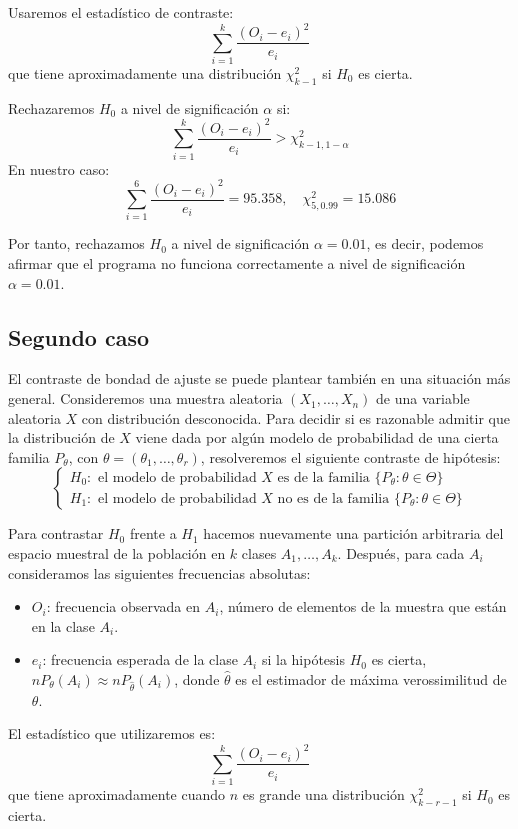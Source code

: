 \begin{example}
    Usaremos el estadístico de contraste:
    $$\sum_{i=1}^k \frac{(O_i-e_i)^2}{e_i}$$
    que tiene aproximadamente una distribución $\chi^2_{k-1}$ si $H_0$ es cierta.

    Rechazaremos $H_0$ a nivel de significación $\alpha$ si:
    $$\sum_{i=1}^k \frac{(O_i-e_i)^2}{e_i} > \chi^2_{k-1, 1-\alpha}$$
    En nuestro caso:
    $$\sum_{i=1}^6 \frac{(O_i-e_i)^2}{e_i} = 95.358, \quad \chi^2_{5, 0.99} = 15.086$$

    Por tanto, rechazamos $H_0$ a nivel de significación $\alpha = 0.01$, es decir, podemos afirmar que el programa no funciona correctamente a nivel de significación $\alpha = 0.01$.
\end{example}

\subsection*{Segundo caso}
El contraste de bondad de ajuste se puede plantear también en una situación más general.
Consideremos una muestra aleatoria $(X_1, \dots, X_n)$ de una variable aleatoria $X$ con distribución desconocida.
Para decidir si es razonable admitir que la distribución de $X$ viene dada por algún modelo de probabilidad de una cierta familia $P_\theta$, con $\theta = (\theta_1, \dots, \theta_r)$, resolveremos el siguiente contraste de hipótesis:
$$\begin{cases}
        H_0: \text{ el modelo de probabilidad } X \text{ es de la familia } \{P_\theta: \theta \in \Theta\} \\
        H_1: \text{ el modelo de probabilidad } X \text{ no es de la familia } \{P_\theta: \theta \in \Theta\}
    \end{cases}$$

Para contrastar $H_0$ frente a $H_1$ hacemos nuevamente una partición arbitraria del espacio muestral de la población en $k$ clases $A_1, \dots, A_k$.
Después, para cada $A_i$ consideramos las siguientes frecuencias absolutas:
\begin{itemize}
    \item $O_i$: frecuencia observada en $A_i$, número de elementos de la muestra que están en la clase $A_i$.
    \item $e_i$: frecuencia esperada de la clase $A_i$ si la hipótesis $H_0$ es cierta, $nP_\theta(A_i) \approx nP_{\hat{\theta}}(A_i)$, donde $\hat{\theta}$ es el estimador de máxima verossimilitud de $\theta$.
\end{itemize}

El estadístico que utilizaremos es:
$$\sum_{i=1}^k \frac{(O_i-e_i)^2}{e_i}$$
que tiene aproximadamente cuando $n$ es grande una distribución $\chi^2_{k-r-1}$ si $H_0$ es cierta.

